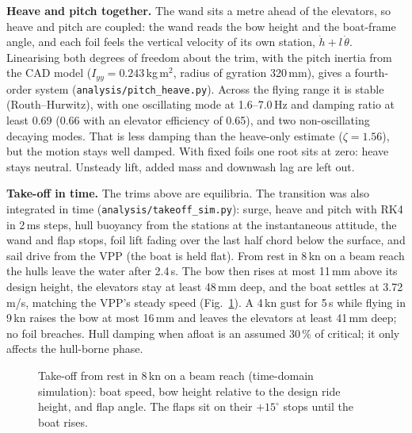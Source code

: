 \documentclass[10pt,twocolumn]{article}
\begin{document}
\noindent\textbf{Heave and pitch together.} The wand sits a metre ahead of the elevators, so heave and pitch are coupled: the wand reads the bow height and the boat-frame angle, and each foil feels the vertical velocity of its own station, $\dot h + l\,\dot\theta$. Linearising both degrees of freedom about the trim, with the pitch inertia from the CAD model ($I_{yy}=0.243$\,kg\,m$^2$, radius of gyration 320\,mm), gives a fourth-order system (\texttt{analysis/pitch\_heave.py}). Across the flying range it is stable (Routh--Hurwitz), with one oscillating mode at 1.6--7.0\,Hz and damping ratio at least 0.69 (0.66 with an elevator efficiency of 0.65), and two non-oscillating decaying modes. That is less damping than the heave-only estimate ($\zeta=1.56$), but the motion stays well damped. With fixed foils one root sits at zero: heave stays neutral. Unsteady lift, added mass and downwash lag are left out.

\noindent\textbf{Take-off in time.} The trims above are equilibria. The transition was also integrated in time (\texttt{analysis/takeoff\_sim.py}): surge, heave and pitch with RK4 in 2\,ms steps, hull buoyancy from the stations at the instantaneous attitude, the wand and flap stops, foil lift fading over the last half chord below the surface, and sail drive from the VPP (the boat is held flat). From rest in 8\,kn on a beam reach the hulls leave the water after 2.4\,s. The bow then rises at most 11\,mm above its design height, the elevators stay at least 48\,mm deep, and the boat settles at 3.72\,m/s, matching the VPP's steady speed (Fig.~\ref{fig:ts}). A 4\,kn gust for 5\,s while flying in 9\,kn raises the bow at most 16\,mm and leaves the elevators at least 41\,mm deep; no foil breaches. Hull damping when afloat is an assumed 30\,\% of critical; it only affects the hull-borne phase.

\begin{figure}[t]
\centering
{}
\caption{Take-off from rest in 8\,kn on a beam reach (time-domain simulation): boat speed, bow height relative to the design ride height, and flap angle. The flaps sit on their $+15^\circ$ stops until the boat rises.}
\label{fig:ts}
\end{figure}
\end{document}
